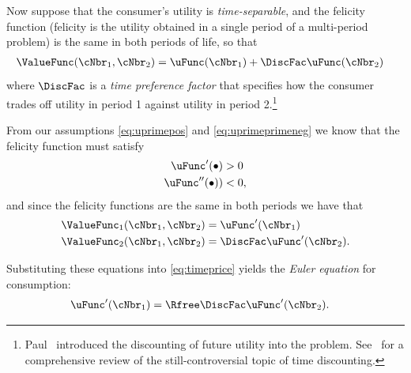   Now suppose that the consumer's utility is \textit{time-separable},
  and the felicity function (felicity is the utility obtained in a
  single period of a multi-period problem) is the same in both periods
  of life, so that
  \begin{equation}\begin{gathered}\begin{aligned}
        \ValueFunc(\cNbr_{1},\cNbr_{2}) & =  \uFunc(\cNbr_{1})+\DiscFac \uFunc(\cNbr_{2})
      \end{aligned}\end{gathered}\end{equation}
  where $\DiscFac$ is a \textit{time preference factor} that specifies how
  the consumer trades off utility in period 1 against utility in period
  2.\footnote{Paul~\cite{samuelson1937note,samuelsonOLG} introduced the
    discounting of future utility into the problem.  See~\cite{floDiscounting} for
    a comprehensive review of the still-controversial topic of time discounting.}

  From our assumptions \eqref{eq:uprimepos} and \eqref{eq:uprimeprimeneg}
  we know that the felicity function must satisfy
  \begin{equation}\begin{gathered}\begin{aligned}
        \uFunc^{\prime}(\bullet) & >  0  \\
        \uFunc^{\prime\prime}(\bullet)) & <  0,
      \end{aligned}\end{gathered}\end{equation}
  and since the felicity functions are the same in both periods we have
  that
  \begin{equation}\begin{gathered}\begin{aligned}
        \ValueFunc_{1}(\cNbr_{1},\cNbr_{2}) & =  \uFunc^{\prime}(\cNbr_{1})
        \\ \ValueFunc_{2}(\cNbr_{1},\cNbr_{2}) & =  \DiscFac \uFunc^{\prime}(\cNbr_{2}).
      \end{aligned}\end{gathered}\end{equation}

  Substituting these equations into \eqref{eq:timeprice} yields
  the \textit{Euler equation} for consumption:
  \begin{equation}\begin{gathered}\begin{aligned}
        \uFunc^{\prime}(\cNbr_{1}) & =  \Rfree \DiscFac \uFunc^{\prime}(\cNbr_{2}). \label{eq:euler}
      \end{aligned}\end{gathered}\end{equation}

